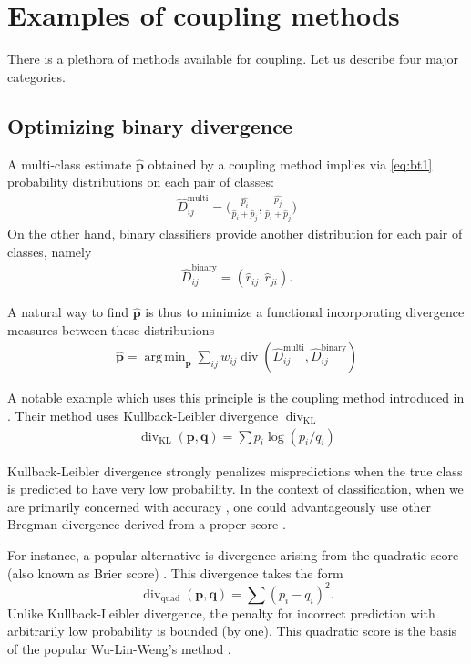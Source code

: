 \documentclass[twoside,11pt]{article}
\DeclareMathOperator*{\divm}{div}
\DeclareMathOperator*{\argmin}{arg\,min}
\begin{document}
\section{Examples of coupling methods} \label{sec:coupling}

There is a plethora of methods available for coupling. Let us describe four major categories.




\subsection{Optimizing binary divergence}

A multi-class estimate $\hat{\boldsymbol{p}}$ obtained by a coupling method implies via \eqref{eq:bt1} probability distributions on each pair of classes:
\begin{align*}
	\hat D_{ij}^\textrm{multi}= \biggl(\frac{\hat{p_i}}{\hat p_i + \hat p_j},\frac{\hat{p_j}}{\hat p_i + \hat p_j}\biggr)	
\end{align*}
On the other hand, binary classifiers provide another distribution for each pair of  classes, namely
\begin{align*}
\hat D_{ij}^\textrm{binary} = (\hat r_{ij}, \hat r_{ji}).
\end{align*}

A natural way to find  $\hat{\boldsymbol{p}}$ is thus to minimize a functional incorporating divergence measures between these distributions
\begin{align*}
\hat{\boldsymbol{p}} = \argmin_{\boldsymbol{p}} \sum_{ij} w_{ij} \divm (\hat D_{ij}^\textrm{multi}, \hat D_{ij}^\textrm{binary})
\end{align*}

A notable example which uses this principle is the coupling method introduced in \cite{hastie1998classification}. Their method uses Kullback-Leibler divergence $\divm_\textrm{KL}$
\begin{align*}
	\divm\nolimits_\textrm{KL} (\boldsymbol{p}, \boldsymbol{q})= \sum p_i \log (p_i/ q_i)
\end{align*}

Kullback-Leibler divergence strongly penalizes  mispredictions when the true class is predicted to have very low probability. In the context of classification, when we are primarily concerned with accuracy , one could advantageously use other Bregman divergence derived from a proper score \cite{gneiting2007strictly}.
 
For instance, a popular alternative is divergence arising from the quadratic  score (also known as Brier score) \cite{gneiting2007strictly}. This divergence takes the form
$$
\divm\nolimits_\textrm{quad} (\boldsymbol{p}, \boldsymbol{q})= \sum (p_i - q_i)^2.
$$
Unlike Kullback-Leibler divergence, the penalty for incorrect prediction with arbitrarily low probability is bounded (by one). This quadratic score is the basis of the popular Wu-Lin-Weng's method \cite{wu2004probability}. 
\end{document}
